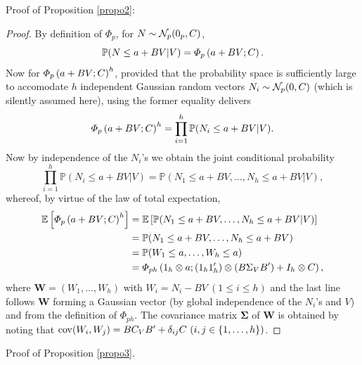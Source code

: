 \documentclass[aoas]{imsart}
\begin{document}
Proof of Proposition \ref{propo2}:

\begin{proof}
	By definition of $\Phi_{p}$, for $N\sim \mathcal{N}_{p}(0_{p},C)$, 
	$$
	\mathbb{P}(N\leq a + BV | V)
	=
	\varPhi_{p}\left( a + BV; C \right).
	$$
	Now for $\varPhi_{p}\left( a + BV; C \right)^h$, provided that the probability space is sufficiently large to accomodate $h$ independent Gaussian random vectors $N_i\sim \mathcal{N}_{p}(0,C)$ (which is silently assumed here), using the former equality delivers 
	$$
	\varPhi_{p}\left( a + BV; C \right)^h
	=
	\prod_{i=1}^h \mathbb{P}(N_i\leq a + BV | V).
	$$
	Now by independence of the $N_i$'s we obtain the joint conditional probability 
	$$
	\prod_{i=1}^h \mathbb{P}(N_i\leq a + BV | V)
	=
	\mathbb{P}(N_1\leq a + BV, \dots, N_h\leq a + BV| V),
	$$
	whereof, by virtue of the law of total expectation, 
	\begin{equation*}
	\begin{split}
	\mathbb{E}\left[ \varPhi_{p}\left( a + BV; \covN \right)^h \right]
	&=\mathbb{E}\left[\mathbb{P}(N_1\leq a + BV, \dots, N_h\leq a + BV| V)\right]\\
	&=\mathbb{P}(N_1\leq a + BV, \dots, N_h\leq a + BV)\\
	&=\mathbb{P}(W_1 \leq a, \dots, W_h\leq a)\\
	&=\varPhi_{ph}
	\left(
	1_{h} \otimes a
	;
	(1_{h}1_{h}')\otimes (B\Sigma_{V} B') + 
	I_{h}\otimes \covN
	\right),
	\end{split}
	\end{equation*}
	where $\mathbf{W}=(W_1,\dots,W_h)$ with $W_i=N_i- BV \ (1\leq i \leq h)$
	and the last line follows $\mathbf{W}$ forming a Gaussian vector (by global independence of the $N_i$'s and $V$) and from the definition of $\varPhi_{p h}$. The covariance matrix $\mathbf{\Sigma}$ of $\mathbf{W}$ is obtained by noting that $\operatorname{cov}(W_i,W_j)=B \covV B' + \delta_{ij} \covN \ 
	(i,j \in \{1,\dots,h\})$.
\end{proof}


Proof of Proposition \ref{propo3}.
\end{document}
